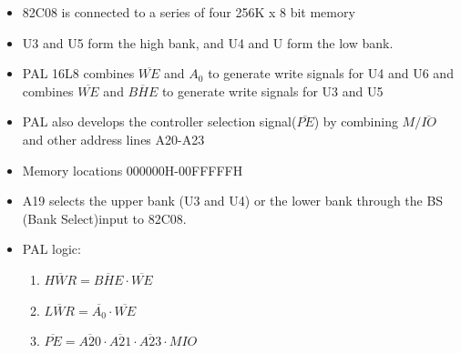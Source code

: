 \begin{itemize}
  \item 82C08 is connected to a series of four 256K x 8 bit memory
  \item U3 and U5 form the high bank, and U4 and U form the low bank.
  \item PAL 16L8 combines $\overline{WE}$ and $A_0$ to generate write signals for U4 and U6 and
  combines $\overline{WE}$ and $\overline{BHE}$ to generate write signals for U3 and U5
  \item PAL also develops the controller selection signal($\overline{PE}$) by combining $M/\overline{IO}$ and other address lines A20-A23
  \item Memory locations 000000H-00FFFFFH\item A19 selects the upper bank (U3 and U4) or the lower bank through the BS (Bank Select)input to 82C08.
  \item PAL logic:
  \begin{enumerate}
    \item $\overline{HWR} = \overline{BHE} \cdot \overline{WE}$
    \item $\overline{LWR} = \overline{A_0} \cdot \overline{WE}$
    \item $\overline{PE} = \overline{A20} \cdot \overline{A21} \cdot \overline{A23} \cdot MIO $
  \end{enumerate}
\end{itemize}
